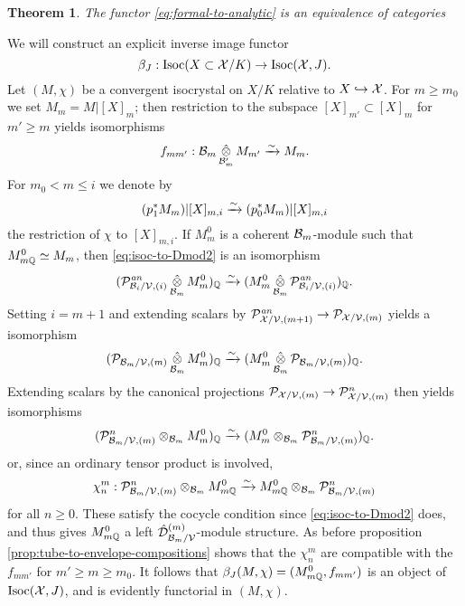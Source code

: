 \documentclass{article}
\theoremstyle{change}
\newtheorem{thm}[subsubsection]{Theorem}
\numberwithin{equation}{subsubsection}
\newcommand{\demobox}{\vrule height6pt width6pt depth0pt}
\newenvironment{demo}{\noindent{\it Proof.}}
{{\unskip\nobreak\hfil\qquad
\demobox\parfillskip=0pt\par}
\medskip}
\begin{document}
\begin{thm}\label{thm:convergent-formal-analytic-comparison}
  The functor \ref{eq:formal-to-analytic} is an equivalence of
  categories
\end{thm}
\begin{demo}
  We will construct an explicit inverse image functor
  \begin{equation}
    \label{eq:isoc-to-Dmod1}
    \beta_J:\mathrm{Isoc}(X\subset{\cal X}/K)\to\mathrm{Isoc}({\cal X},J).
  \end{equation}
  Let $(M,\chi)$ be a convergent isocrystal on $X/K$ relative to
  $X\hookrightarrow{\cal X}$. For $m\ge m_0$ we set $M_m=M|[X]_m$; then restriction to
  the subspace $[X]_{m'}\subset[X]_m$ for $m'\ge m$ yields
  isomorphisms
  \begin{equation}
    \label{eq:isoc-to-Dmod1.5}
    f_{mm'}:{\cal B}_m\mathop{\hat\otimes}_{{\cal B}_m'}M_{m'}\xrightarrow{\sim} M_m. 
  \end{equation}
  For $m_0<m\le i$ we denote by
  \begin{equation}
    \label{eq:isoc-to-Dmod2}
    (p_1^*M_m)|[X]_{m,i}\xrightarrow{\sim}(p_0^*M_m)|[X]_{m,i}
  \end{equation}
  the restriction of $\chi$ to $[X]_{m,i}$. If $M_m^0$ is a coherent
  ${\cal B}_m$-module such that $M^0_{m{\mathbb Q}}\simeq M_m$, then
  \ref{eq:isoc-to-Dmod2} is an isomorphism
  \begin{displaymath}
    ({\cal P}^{\mathit{an}}_{{\cal B}_i/{\cal V},(i)}\mathop{\hat\otimes}_{{\cal B}_m}M^0_m)_{\mathbb Q}\xrightarrow{\sim}
    (M^0_m\mathop{\hat\otimes}_{{\cal B}_m}{\cal P}^{\mathit{an}}_{{\cal B}_i/{\cal V},(i)})_{\mathbb Q}.
  \end{displaymath}
  Setting $i=m+1$ and extending scalars by
  ${\cal P}^{\mathit{an}}_{{\cal X}/{\cal V},(m+1)}\to{\cal P}_{{\cal X}/{\cal V},(m)}$ yields a isomorphism
  \begin{equation}
    \label{eq:isoc-to-Dmod3}
    ({\cal P}_{{\cal B}_m/{\cal V},(m)}\mathop{\hat\otimes}_{{\cal B}_m}M^0_m)_{\mathbb Q}\xrightarrow{\sim}
    (M^0_m\mathop{\hat\otimes}_{{\cal B}_m}{\cal P}_{{\cal B}_m/{\cal V},(m)})_{\mathbb Q}.
  \end{equation}
  Extending scalars by the canonical projections
  ${\cal P}_{{\cal X}/{\cal V},(m)}\to{\cal P}^n_{{\cal X}/{\cal V},(m)}$ then yields isomorphisms
  \begin{displaymath}
    ({\cal P}^n_{{\cal B}_m/{\cal V},(m)}\otimes_{{\cal B}_m}M^0_m)_{\mathbb Q}\xrightarrow{\sim}
    (M^0_m\otimes_{{\cal B}_m}{\cal P}^n_{{\cal B}_m/{\cal V},(m)})_{\mathbb Q}.
  \end{displaymath}
  or, since an ordinary tensor product is involved,
  \begin{equation}
    \label{eq:isoc-to-Dmod4}
    \chi_n^m:{\cal P}^n_{{\cal B}_m/{\cal V},(m)}\otimes_{{\cal B}_m}M^0_{m{\mathbb Q}}\xrightarrow{\sim}
    M^0_{m{\mathbb Q}}\otimes_{{\cal B}_m}{\cal P}^n_{{\cal B}_m/{\cal V},(m)}
  \end{equation}
  for all $n\ge0$. These satisfy the cocycle condition since
  \ref{eq:isoc-to-Dmod2} does, and thus gives $M^0_{m{\mathbb Q}}$ a left
  ${\hat{\cal D}}^{({m})}_{{\cal B}_m/{\cal V}}$-module structure. As before proposition
  \ref{prop:tube-to-envelope-compositions} shows that the $\chi_n^m$
  are compatible with the $f_{mm'}$ for $m'\ge m\ge m_0$. It follows
  that $\beta_J(M,\chi)=(M^0_{m{\mathbb Q}},f_{mm'})$ is an object of
  $\mathrm{Isoc}({\cal X},J)$, and is evidently functorial in $(M,\chi)$. 


\end{demo}
\end{document}
